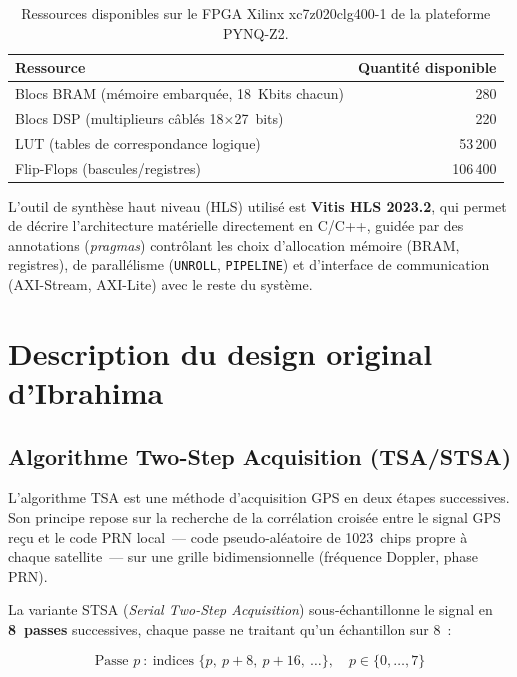 \documentclass[11pt,a4paper]{article}
\begin{document}
\begin{table}[H]
\centering
\renewcommand{\arraystretch}{1.3}
\begin{tabular}{lr}
\toprule
\textbf{Ressource} & \textbf{Quantité disponible} \\
\midrule
Blocs BRAM (mémoire embarquée, 18~Kbits chacun) & 280 \\
Blocs DSP (multiplieurs câblés 18$\times$27~bits) & 220 \\
LUT (tables de correspondance logique) & 53\,200 \\
Flip-Flops (bascules/registres) & 106\,400 \\
\bottomrule
\end{tabular}
\caption{Ressources disponibles sur le FPGA Xilinx xc7z020clg400-1 de la plateforme PYNQ-Z2.}
\end{table}

L'outil de synthèse haut niveau (HLS) utilisé est \textbf{Vitis HLS 2023.2}, qui permet de décrire l'architecture matérielle directement en C/C++, guidée par des annotations (\textit{pragmas}) contrôlant les choix d'allocation mémoire (BRAM, registres), de parallélisme (\texttt{UNROLL}, \texttt{PIPELINE}) et d'interface de communication (AXI-Stream, AXI-Lite) avec le reste du système.


\section{Description du design original d'Ibrahima}
\label{sec:design-original}

\subsection{Algorithme Two-Step Acquisition (TSA/STSA)}

L'algorithme TSA est une méthode d'acquisition GPS en deux étapes successives. Son principe repose sur la recherche de la corrélation croisée entre le signal GPS reçu et le code PRN local~--- code pseudo-aléatoire de 1023~chips propre à chaque satellite~--- sur une grille bidimensionnelle (fréquence Doppler, phase PRN).

La variante STSA (\textit{Serial Two-Step Acquisition}) sous-échantillonne le signal en \textbf{8~passes} successives, chaque passe ne traitant qu'un échantillon sur 8~:

\begin{equation}
\text{Passe } p ~:~ \text{indices } \{p,\ p+8,\ p+16,\ \ldots\}, \quad p \in \{0,\ldots,7\}
\end{equation}
\end{document}
